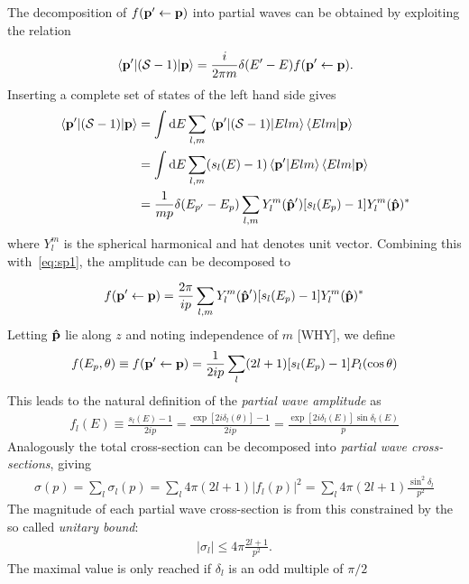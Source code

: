 The decomposition of \(f(\vb{p}^{\prime}\leftarrow\vb{p})\) into partial waves
can be obtained by exploiting the relation

\begin{equation}
  \label{eq:sp1}
  \mel{\vb{p}^{\prime}}{(\mathcal{S}-1)}{\vb{p}} = \frac{i}{2\pi m}\delta(E^{\prime}-E)f(\vb{p}^{\prime}\leftarrow \vb{p}).
\end{equation}
Inserting a complete set of states of the left hand side gives
\begin{align*}
  \mel{\vb{p}^{\prime}}{(\scat-1)}{\vb{p}} &= \int \dd E \sum_{l, m}  \mel{\vb{p}^{\prime}}{(\scat-1)}{Elm}\ip{Elm}{\vb{p}}\\
                                             &=  \int \dd E \sum_{l, m} (s_{l}(E)-1) \ip{\vb{p}^{\prime}}{Elm}\ip{Elm}{\vb{p}}\\
  &= \frac{1}{mp}\delta(E_{p^{\prime}}-E_{p})\sum_{l,m}Y_{l}^{m}(\vu{p}^{\prime})[s_{l}(E_{p})-1]Y^{m}_{l}(\vu{p})^{*}
\end{align*}
where \(Y_{l}^{m}\) is the spherical harmonical and hat denotes unit vector. Combining this
with~\eqref{eq:sp1}, the amplitude can be decomposed to

\begin{align*}
  f(\vb{p}^{\prime}\leftarrow\vb{p}) = \frac{2\pi}{ip}\sum_{l,m}Y_{l}^{m}(\vu{p}^{\prime})[s_{l}(E_{p})-1]Y^{m}_{l}(\vu{p})^{*}
\end{align*}
Letting \(\vu{p}\) lie along \(z\) and noting independence of \(m\) [WHY], we
define
\begin{align*}
  f(E_{p},\theta) \equiv f(\vb{p}^{\prime}\leftarrow\vb{p})=\frac{1}{2ip}\sum_{l}(2l+1)[s_{l}(E_{p})-1]P_{l}(\cos\theta)
\end{align*}
This leads to the natural definition of the \textit{partial wave amplitude} as
\begin{align*}
  f_{l}(E) \equiv \frac{s_{l}(E)-1}{2ip} = \frac{\exp[ 2i\delta_{l}(\theta)] - 1}{2ip} = \frac{\exp[2i\delta_{l}(E)]\sin\delta_{l}(E)}{p}
\end{align*}
Analogously the total cross-section can be decomposed into \textit{partial wave
  cross-sections}, giving
\begin{align*}
  \sigma(p) = \sum_{l}\sigma_{l}(p) = \sum_{l}4\pi(2l+1)\left| f_{l}(p) \right|^{2} = \sum_{l}4\pi(2l+1)\frac{\sin^{2}\delta_{l}}{p^{2}}
\end{align*}
The magnitude of each partial wave cross-section is from this constrained by the
so called \textit{unitary bound}: 
\begin{align*}
  |\sigma_{l}| \leq 4\pi\frac{2l+1}{p^{2}}.
\end{align*}
The maximal value is only reached if
\(\delta_{l}\) is an odd multiple of \(\pi/2\)

